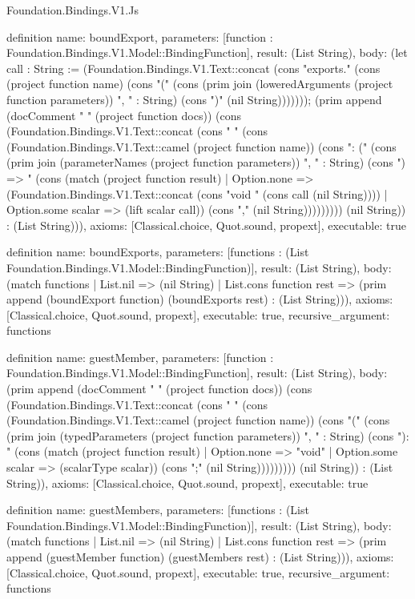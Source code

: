 \begin{lexlean}{Foundation.Bindings.V1.Js}
\begin{semanticmodule}
definition{
  name: boundExport,
  parameters: [function : Foundation.Bindings.V1.Model::BindingFunction],
  result: (List String),
  body: (let call : String := (Foundation.Bindings.V1.Text::concat (cons "exports." (cons (project function name) (cons "(" (cons (prim join (loweredArguments (project function parameters)) ", " : String) (cons ")" (nil String))))))); (prim append (docComment "    " (project function docs)) (cons (Foundation.Bindings.V1.Text::concat (cons "    " (cons (Foundation.Bindings.V1.Text::camel (project function name)) (cons ": (" (cons (prim join (parameterNames (project function parameters)) ", " : String) (cons ") => " (cons (match (project function result)
    | Option.none => (Foundation.Bindings.V1.Text::concat (cons "void " (cons call (nil String))))
    | Option.some scalar => (lift scalar call)) (cons "," (nil String))))))))) (nil String)) : (List String))),
  axioms: [Classical.choice, Quot.sound, propext],
  executable: true
}

definition{
  name: boundExports,
  parameters: [functions : (List Foundation.Bindings.V1.Model::BindingFunction)],
  result: (List String),
  body: (match functions
    | List.nil => (nil String)
    | List.cons function rest => (prim append (boundExport function) (boundExports rest) : (List String))),
  axioms: [Classical.choice, Quot.sound, propext],
  executable: true,
  recursive_argument: functions
}

definition{
  name: guestMember,
  parameters: [function : Foundation.Bindings.V1.Model::BindingFunction],
  result: (List String),
  body: (prim append (docComment "  " (project function docs)) (cons (Foundation.Bindings.V1.Text::concat (cons "  " (cons (Foundation.Bindings.V1.Text::camel (project function name)) (cons "(" (cons (prim join (typedParameters (project function parameters)) ", " : String) (cons "): " (cons (match (project function result)
    | Option.none => "void"
    | Option.some scalar => (scalarType scalar)) (cons ";" (nil String))))))))) (nil String)) : (List String)),
  axioms: [Classical.choice, Quot.sound, propext],
  executable: true
}

definition{
  name: guestMembers,
  parameters: [functions : (List Foundation.Bindings.V1.Model::BindingFunction)],
  result: (List String),
  body: (match functions
    | List.nil => (nil String)
    | List.cons function rest => (prim append (guestMember function) (guestMembers rest) : (List String))),
  axioms: [Classical.choice, Quot.sound, propext],
  executable: true,
  recursive_argument: functions
}


\end{semanticmodule}
\end{lexlean}
